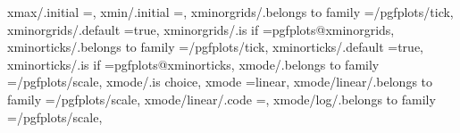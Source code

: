 {{{{{{{{{{{xmax/.initial                                                      =,                                                                                                                                  
xmin/.initial                                                      =,                                                                                                                                  
xminorgrids/.belongs to family                                     =/pgfplots/tick,                                                                                                                    
xminorgrids/.default                                               =true,                                                                                                                              
xminorgrids/.is if                                                 =pgfplots@xminorgrids,                                                                                                              
xminorticks/.belongs to family                                     =/pgfplots/tick,                                                                                                                    
xminorticks/.default                                               =true,                                                                                                                              
xminorticks/.is if                                                 =pgfplots@xminorticks,                                                                                                              
xmode/.belongs to family                                           =/pgfplots/scale,                                                                                                                   
xmode/.is choice,
xmode                                                              =linear,                                                                                                                            
xmode/linear/.belongs to family                                    =/pgfplots/scale,                                                                                                                   
xmode/linear/.code                                                 ={\pgfplots@xislineartrue},                                                                                                         
xmode/log/.belongs to family                                       =/pgfplots/scale,                                                                                                                   
}}}}}}}}}}}
